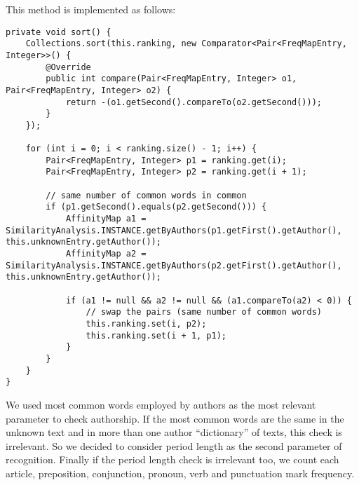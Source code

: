 \documentclass[a4paper,11pt, twoside]{article}
\begin{document}
		\noindent
		This method is implemented as follows:
		\begin{lstlisting}[firstnumber=32,caption={Ranking sort method}, captionpos=b, label={lst:sortmethod}]
private void sort() {
	Collections.sort(this.ranking, new Comparator<Pair<FreqMapEntry, Integer>>() {
		@Override
		public int compare(Pair<FreqMapEntry, Integer> o1, Pair<FreqMapEntry, Integer> o2) {
			return -(o1.getSecond().compareTo(o2.getSecond()));
		}
	});

	for (int i = 0; i < ranking.size() - 1; i++) {
		Pair<FreqMapEntry, Integer> p1 = ranking.get(i);
		Pair<FreqMapEntry, Integer> p2 = ranking.get(i + 1);

		// same number of common words in common
		if (p1.getSecond().equals(p2.getSecond())) { 
			AffinityMap a1 = SimilarityAnalysis.INSTANCE.getByAuthors(p1.getFirst().getAuthor(), this.unknownEntry.getAuthor());
			AffinityMap a2 = SimilarityAnalysis.INSTANCE.getByAuthors(p2.getFirst().getAuthor(), this.unknownEntry.getAuthor());

			if (a1 != null && a2 != null && (a1.compareTo(a2) < 0)) {
				// swap the pairs (same number of common words)
				this.ranking.set(i, p2);
				this.ranking.set(i + 1, p1);
			}
		}
	}
}
		\end{lstlisting}

		\noindent
		We used most common words employed by authors as the most relevant parameter to check authorship. If the most common words are the same in the unknown text and in more than one author ``dictionary'' of texts, this check is irrelevant. So we decided to consider period length as the second parameter of recognition. Finally if the period length check is irrelevant too, we count each article, preposition, conjunction, pronoun, verb and punctuation mark frequency.

		\bigskip
\end{document}
